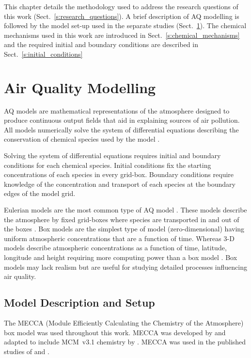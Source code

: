 This chapter details the methodology used to address the research questions of this work (Sect.~\ref{s:research_questions}).
A brief description of AQ modelling is followed by the model set-up used in the separate studies (Sect.~\ref{s:modelling}). 
The chemical mechanisms used in this work are introduced in Sect.~\ref{s:chemical_mechanisms} and the required initial and boundary conditions are described in Sect.~\ref{s:initial_conditions} 

\section{Air Quality Modelling} \label{s:modelling}
AQ models are mathematical representations of the atmosphere designed to produce continuous output fields that aid in explaining sources of air pollution.
All models numerically solve the system of differential equations describing the conservation of chemical species used by the model \citep{Russell:2000}.

Solving the system of differential equations requires initial and boundary conditions for each chemical species.
Initial conditions fix the starting concentrations of each species in every grid-box.
Boundary conditions require knowledge of the concentration and transport of each species at the boundary edges of the model grid.

Eulerian models are the most common type of AQ model \citep{Russell:2000}.
These models describe the atmosphere by fixed grid-boxes where species are transported in and out of the boxes \citep{Seinfeld:2006}. 
Box models are the simplest type of model (zero-dimensional) having uniform atmospheric concentrations that are a function of time.
Whereas 3-D models describe atmospheric concentrations as a function of time, latitude, longitude and height requiring more computing power than a box model \citep{Seinfeld:2006}.
Box models may lack realism but are useful for studying detailed processes influencing air quality.

\subsection{Model Description and Setup} \label{ss:model_setup}
The MECCA (Module Efficiently Calculating the Chemistry of the Atmosphere) box model was used throughout this work.
MECCA was developed by \citet{Sander:2005} and adapted to include MCM~v3.1 chemistry by \citet{Butler:2011}.
MECCA was used in the published studies of \citet{Kubistin:2010} and \citet{Lourens:2016}.

